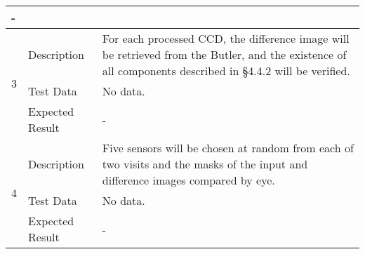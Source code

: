 \begin{longtable}[]{p{1.3cm}p{2cm}p{13cm}}
\begin{minipage}[t]{13cm}{\footnotesize
-
\vspace{\dp0}
} \end{minipage} 


\\ \midrule



\multirow{3}{*}{ 3 } & Description &
\begin{minipage}[t]{13cm}{\footnotesize
For each processed CCD, the difference image will be retrieved from the
Butler, and the existence of all components described in §4.4.2 will be
verified.
 
\vspace{\dp0}
} \end{minipage} \\ \cline{2-3}
& Test Data & 
\begin{minipage}[t]{13cm}{\footnotesize

No data. 
\vspace{\dp0}

} \end{minipage} \\ \cline{2-3}
& Expected Result &

\begin{minipage}[t]{13cm}{\footnotesize
-
\vspace{\dp0}
} \end{minipage} 


\\ \midrule



\multirow{3}{*}{ 4 } & Description &
\begin{minipage}[t]{13cm}{\footnotesize
Five sensors will be chosen at random from each of two visits and the
masks of the input and difference images compared by eye.
 
\vspace{\dp0}
} \end{minipage} \\ \cline{2-3}
& Test Data & 
\begin{minipage}[t]{13cm}{\footnotesize

No data. 
\vspace{\dp0}

} \end{minipage} \\ \cline{2-3}
& Expected Result &

\begin{minipage}[t]{13cm}{\footnotesize
-
\vspace{\dp0}
} \end{minipage} 


\\ \midrule

\end{longtable}




